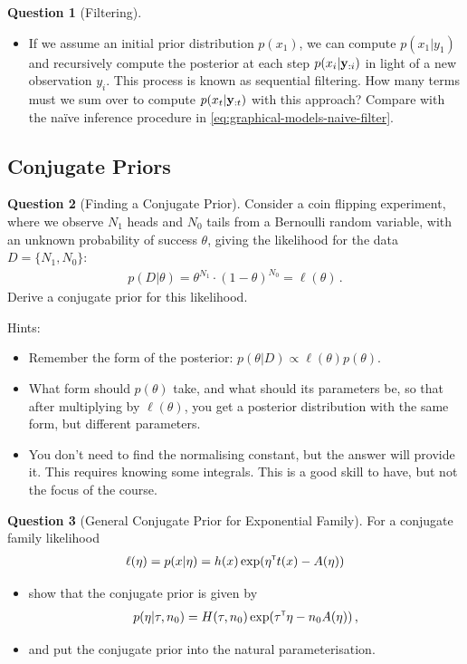 \documentclass[a4paper]{article}
\theoremstyle{definition}
\newtheorem{question}{Question}
\begin{document}
\begin{question}[Filtering]
\begin{itemize}
\item If we assume an initial prior distribution $p( x_1 )$, we can compute $p( x_1 | y_1 )$ and recursively compute the posterior at each step $p( x_i | \mathbf{y}_{:i} )$ in light of a new observation $y_i$. This process is known as sequential filtering. How many terms must we sum over to compute $p( x_t | \mathbf{y}_{:t} )$ with this approach? Compare with the na\"{i}ve inference procedure in \eqref{eq:graphical-models-naive-filter}.
\end{itemize}


\end{question}


\subsection{Conjugate Priors}
\begin{question}[Finding a Conjugate Prior]
\label{q:cp-binomial}
Consider a coin flipping experiment, where we observe $N_1$ heads and $N_0$ tails from a Bernoulli random variable, with an unknown probability of success $\theta$, giving the likelihood for the data $D = \{N_1, N_0\}$:
\begin{align}
p(D|\theta) = \theta^{N_1}\cdot(1-\theta)^{N_0} = \ell(\theta) \,.
\end{align}
Derive a conjugate prior for this likelihood.

Hints:
\begin{itemize}
\item Remember the form of the posterior: $p(\theta|D) \propto \ell(\theta) p(\theta)$.
\item What form should $p(\theta)$ take, and what should its parameters be, so that after multiplying by $\ell(\theta)$, you get a posterior distribution with the same form, but different parameters.
\item You don't need to find the normalising constant, but the answer will provide it. This requires knowing some integrals. This is a good skill to have, but not the focus of the course.
\end{itemize}
\end{question}


\begin{question}[General Conjugate Prior for Exponential Family]
\label{q:cp-exp-fam}
For a conjugate family likelihood
\begin{align}
\ell(\eta) = p(x|\eta) = h(x) \exp\left(\eta\transpose t(x) - A(\eta)\right)
\end{align}
\begin{itemize}
\item show that the conjugate prior is given by
\begin{align}
p(\eta|\tau, n_0) = H(\tau, n_0)\exp(\tau^\mathrm{\textsf{\tiny T}}\eta - n_0 A(\eta)) \,,
\end{align}
\item and put the conjugate prior into the natural parameterisation.
\end{itemize}
\end{question}
\end{document}
